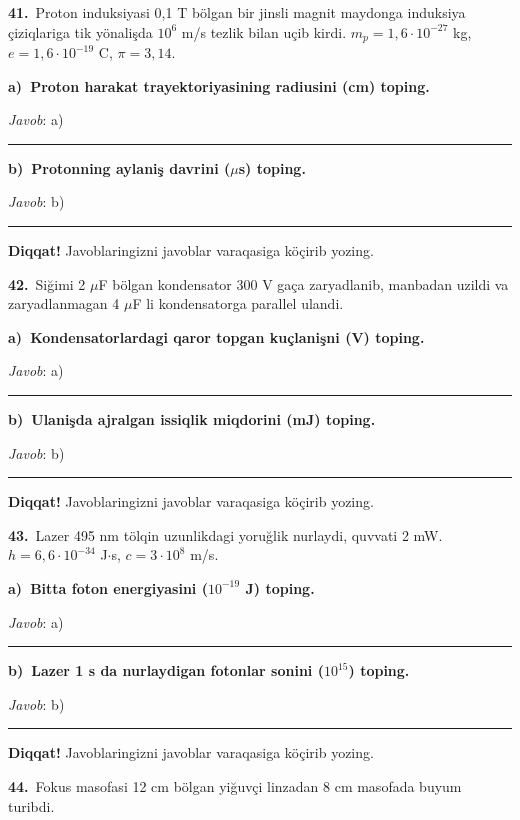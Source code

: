 \documentclass[11pt,a4paper]{article}
\newcommand{\blank}{\rule{5cm}{0.4pt}}
\begin{document}
\noindent\textbf{41.}\ Proton induksiyasi 0,1 T bölgan bir jinsli magnit maydonga induksiya çiziqlariga tik yönalişda $10^6$ m/s tezlik bilan uçib kirdi. $m_p=1{,}6\cdot10^{-27}$ kg, $e=1{,}6\cdot10^{-19}$ C, $\pi=3{,}14$.\par\smallskip
\medskip\noindent\textbf{a)\ Proton harakat trayektoriyasining radiusini (cm) toping.}\par
\noindent\textit{Javob}: a)\ \blank\par
\medskip\noindent\textbf{b)\ Protonning aylaniş davrini ($\mu$s) toping.}\par
\noindent\textit{Javob}: b)\ \blank\par
\medskip\noindent\textbf{Diqqat!} Javoblaringizni javoblar varaqasiga köçirib yozing.\par\vspace{10pt}
\noindent\textbf{42.}\ Siğimi 2 $\mu$F bölgan kondensator 300 V gaça zaryadlanib, manbadan uzildi va zaryadlanmagan 4 $\mu$F li kondensatorga parallel ulandi.\par\smallskip
\medskip\noindent\textbf{a)\ Kondensatorlardagi qaror topgan kuçlanişni (V) toping.}\par
\noindent\textit{Javob}: a)\ \blank\par
\medskip\noindent\textbf{b)\ Ulanişda ajralgan issiqlik miqdorini (mJ) toping.}\par
\noindent\textit{Javob}: b)\ \blank\par
\medskip\noindent\textbf{Diqqat!} Javoblaringizni javoblar varaqasiga köçirib yozing.\par\vspace{10pt}
\noindent\textbf{43.}\ Lazer 495 nm tölqin uzunlikdagi yoruğlik nurlaydi, quvvati 2 mW. $h=6{,}6\cdot10^{-34}$ J$\cdot$s, $c=3\cdot10^8$ m/s.\par\smallskip
\medskip\noindent\textbf{a)\ Bitta foton energiyasini ($10^{-19}$ J) toping.}\par
\noindent\textit{Javob}: a)\ \blank\par
\medskip\noindent\textbf{b)\ Lazer 1 s da nurlaydigan fotonlar sonini ($10^{15}$) toping.}\par
\noindent\textit{Javob}: b)\ \blank\par
\medskip\noindent\textbf{Diqqat!} Javoblaringizni javoblar varaqasiga köçirib yozing.\par\vspace{10pt}
\noindent\textbf{44.}\ Fokus masofasi 12 cm bölgan yiğuvçi linzadan 8 cm masofada buyum turibdi.\par\smallskip
\end{document}
